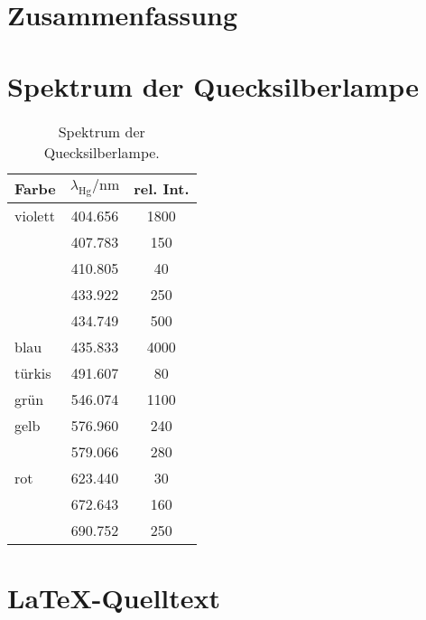 \FloatBarrier
\section{Zusammenfassung}


\FloatBarrier
\begin{appendix}
    \section{Spektrum der Quecksilberlampe}
    \label{sec:spektrum}

    \begin{table}[htbp]
        \centering
        \begin{tabular}{lSS}
            Farbe & {$\lambda_\text{Hg} / \si{\nano\meter}$} & {rel. Int.} \\
            \hline
            violett & 404.656 & 1800 \\
                    & 407.783 & 150 \\
                    & 410.805 & 40 \\
                    & 433.922 & 250 \\
                    & 434.749 & 500 \\
            blau & 435.833 & 4000 \\
            türkis & 491.607 & 80 \\
            grün & 546.074 & 1100 \\
            gelb & 576.960 & 240 \\
                 & 579.066 & 280 \\
            rot & 623.440 & 30 \\
                & 672.643 & 160 \\
                & 690.752 & 250
        \end{tabular}
        \caption{%
            Spektrum der Quecksilberlampe.
            \cite[P402.6.1]{physik412-Anleitung}
        }
        \label{tab:messdaten:gitterkonstante}
    \end{table}



    \section{\LaTeX-Quelltext}


\end{appendix}
